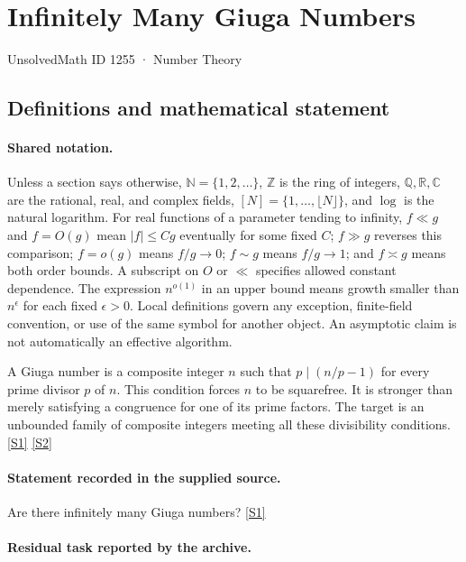 \documentclass[11pt,a4paper]{article}
\newcommand{\N}{\mathbb{N}}
\newcommand{\Z}{\mathbb{Z}}
\newcommand{\Q}{\mathbb{Q}}
\newcommand{\R}{\mathbb{R}}
\newcommand{\C}{\mathbb{C}}
\newcommand{\sref}[2]{\hyperlink{source:#1:#2}{[S#2]}}
\begin{document}

\setcounter{section}{1254}

\section{Infinitely Many Giuga Numbers}\label{1255}

{\small\sffamily UnsolvedMath ID 1255 · Number Theory}

\subsection{Definitions and mathematical statement}

\paragraph{Shared notation.}Unless a section says otherwise, $\N=\{1,2,\ldots\}$,
$\Z$ is the ring of integers, $\Q,\R,\C$ are the rational, real, and complex
fields, $[N]=\{1,\ldots,\lfloor N\rfloor\}$, and $\log$ is the natural
logarithm. For real functions of a parameter tending to infinity,
$f\ll g$ and $f=O(g)$ mean $|f|\leq Cg$ eventually for some fixed $C$;
$f\gg g$ reverses this comparison; $f=o(g)$ means $f/g\to0$;
$f\sim g$ means $f/g\to1$; and $f\asymp g$ means both order bounds.
A subscript on $O$ or $\ll$ specifies allowed constant dependence.
The expression $n^{o(1)}$ in an upper bound means growth smaller than
$n^\epsilon$ for each fixed $\epsilon>0$. Local definitions govern any
exception, finite-field convention, or use of the same symbol for another
object. An asymptotic claim is not automatically an effective algorithm.



A Giuga number is a composite integer $n$ such that $p\mid(n/p-1)$ for every prime divisor $p$ of $n$. This condition forces $n$ to be squarefree. It is stronger than merely satisfying a congruence for one of its prime factors. The target is an unbounded family of composite integers meeting all these divisibility conditions. \sref{1255}{1} \sref{1255}{2}

\paragraph{Statement recorded in the supplied source.}
Are there infinitely many Giuga numbers? \sref{1255}{1}

\paragraph{Residual task reported by the archive.}
\end{document}
